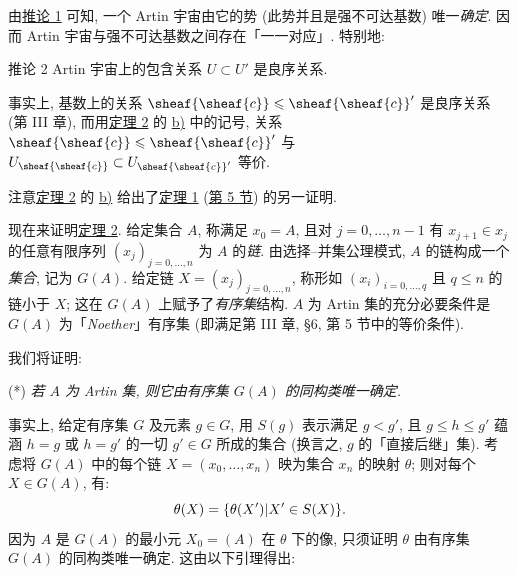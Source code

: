 由\hyperlink{sga4.exp.I.appendix.II.sec.6.corollary.to.theorem.2.1}{推论 1} 可知, 一个 Artin 宇宙由它的势 (此势并且是强不可达基数) 唯一\emph{确定}. 因而 Artin 宇宙与强不可达基数之间存在「一一对应」. 特别地:



\hypertarget{sga4.exp.I.appendix.II.sec.6.corollary.to.theorem.2.2}{}
\begin{enonce*}{推论 2}
Artin 宇宙上的包含关系 $U\subset U'$ 是良序关系.
\end{enonce*}

事实上, 基数上的关系 $\sheaf{\sheaf{c}}\leq \sheaf{\sheaf{c}}'$ 是良序关系 (第 III 章), 而用\hyperlink{sga4.exp.I.appendix.II.sec.6.theorem.2}{定理 2} 的 \hyperlink{sga4.exp.I.appendix.II.sec.6.theorem.2.part.b}{b)} 中的记号, 关系 $\sheaf{\sheaf{c}}\leq\sheaf{\sheaf{c}}'$ 与 $U_{\sheaf{\sheaf{c}}}\subset U_{\sheaf{\sheaf{c}}'}$ 等价.

注意\hyperlink{sga4.exp.I.appendix.II.sec.6.theorem.2}{定理 2} 的 \hyperlink{sga4.exp.I.appendix.II.sec.6.theorem.2.part.b}{b)} 给出了\hyperlink{sga4.exp.I.appendix.II.sec.5.theorem.1}{定理 1} (\hyperlink{sga4.exp.I.appendix.II.sec.5}{第 5 节}) 的另一证明.

现在来证明\hyperlink{sga4.exp.I.appendix.II.sec.6.theorem.2}{定理 2}. 给定集合 $A$, 称满足 $x_0=A$, 且对 $j=0,\ldots,n-1$ 有 $x_{j+1}\in x_j$ 的任意有限序列 $(x_j)_{j=0,\ldots,n}$ 为 $A$ 的\emph{链}. 由选择--并集公理模式, $A$ 的链构成一个\pageoriginale \emph{集合}, 记为 $G(A)$. 给定链 $X=(x_j)_{j=0,\ldots,n}$, 称形如 $(x_i)_{i=0,\ldots,q}$ 且 $q\leq n$ 的链小于 $X$; 这在 $G(A)$ 上赋予了\emph{有序集}结构. $A$ 为 Artin 集的充分必要条件是 $G(A)$ 为「\emph{Noether}」有序集 (即满足第 III 章, \S 6, 第 5 节中的等价条件).

我们将证明:

\hypertarget{sga4.exp.I.appendix.II.sec.6.theorem.2.proof.claim.star}{}
\noindent (*) \emph{若 $A$ 为 Artin 集, 则它由有序集 $G(A)$ 的同构类唯一确定.}

事实上, 给定有序集 $G$ 及元素 $g\in G$, 用 $S(g)$ 表示满足 $g<g'$, 且 $g\leq h\leq g'$ 蕴涵 $h=g$ 或 $h=g'$ 的一切 $g'\in G$ 所成的集合 (换言之, $g$ 的「直接后继」集). 考虑将 $G(A)$ 中的每个链 $X=(x_0,\ldots,x_n)$ 映为集合 $x_n$ 的映射 $\theta$; 则对每个 $X\in G(A)$, 有:
$$
\theta(X)=\{\theta(X')| X'\in S(X)\}{}.
$$
因为 $A$ 是 $G(A)$ 的最小元 $X_0=(A)$ 在 $\theta$ 下的像, 只须证明 $\theta$ 由有序集 $G(A)$ 的同构类唯一确定. 这由以下引理得出:

